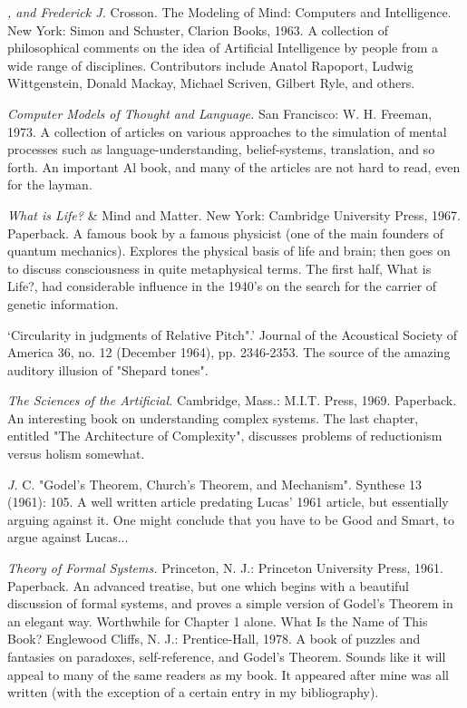  {\sl , and Frederick J.} Crosson. The Modeling of Mind: Computers and Intelligence. New York: Simon and Schuster, Clarion Books, 1963. A collection of philosophical comments on the idea of Artificial Intelligence by people from a wide range of disciplines. Contributors include Anatol Rapoport, Ludwig Wittgenstein, Donald Mackay, Michael Scriven, Gilbert Ryle, and others.

 {\sl Computer Models of Thought and Language.} \llap{*\enspace}San Francisco: W. H. Freeman, 1973. A collection of articles on various approaches to the simulation of mental processes such as language-understanding, belief-systems, translation, and so forth. An important Al book, and many of the articles are not hard to read, even for the layman.

 {\sl What is Life?} \& Mind and Matter. New York: Cambridge University Press, 1967. Paperback. A famous book by a famous physicist (one of the main founders of quantum mechanics). Explores the physical basis of life and brain; then goes on to discuss consciousness in quite metaphysical terms. The first half, What is Life?, had considerable influence in the 1940's on the search for the carrier of genetic information.

 `Circularity in judgments of Relative Pitch".' Journal of the Acoustical Society of America 36, no. 12 (December 1964), pp. 2346-2353. The source of the amazing auditory illusion of "Shepard tones".

 {\sl The Sciences of the Artificial.} Cambridge, Mass.: M.I.T. Press, 1969. Paperback. An interesting book on understanding complex systems. The last chapter, entitled "The Architecture of Complexity", discusses problems of reductionism versus holism somewhat.

 {\sl J.} C. "Godel's Theorem, Church's Theorem, and Mechanism". Synthese 13 (1961): 105. A well written article predating Lucas' 1961 article, but essentially arguing against it. One might conclude that you have to be Good and Smart, to argue against Lucas...

 {\sl Theory of Formal Systems.} \llap{**\enspace}Princeton, N. J.: Princeton University Press, 1961. Paperback. An advanced treatise, but one which begins with a beautiful discussion of formal systems, and proves a simple version of Godel's Theorem in an elegant way. Worthwhile for Chapter 1 alone. What Is the Name of This Book? Englewood Cliffs, N. J.: Prentice-Hall, 1978. A book of puzzles and fantasies on paradoxes, self-reference, and Godel's Theorem. Sounds like it will appeal to many of the same readers as my book. It appeared after mine was all written (with the exception of a certain entry in my bibliography).

